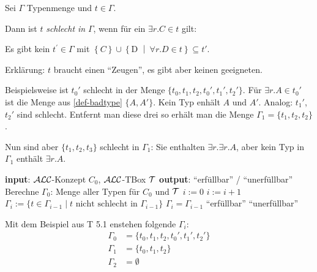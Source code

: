 \begin{definition}\label{def-badtype}

Sei $\Gamma$ Typenmenge und $t \in \Gamma$.

Dann ist $t$ \emph{schlecht in} $\Gamma$, wenn für ein $\exists r.C \in t$ gilt:

\begin{center}Es gibt kein $t^{'} \in \Gamma$ mit
$\left\{ C \right\} \cup \left\{ \text{D\ } \middle| \ \forall r.D \in t \right\} \subseteq t'$.\end{center}
\end{definition}

Erklärung: $t$ braucht einen \enquote{Zeugen}, es gibt aber keinen
geeigneten.

\begin{tafel}[continues=t:synTyp]

    Beispielsweise ist $t_0'$ schlecht in der Menge $\{t_0,t_1,t_2,t_0',t_1',t_2'\}$. Für $\exists r.A \in t_0'$ ist die Menge aus \autoref{def-badtype} $\{A,A'\}$. Kein Typ enhält $A$ und $A'$. Analog: $t_1'$, $t_2'$ sind schlecht. Entfernt man diese drei so erhält man die Menge $\Gamma_1 = \{t_1,t_2,t_2\}$. 

Nun sind aber $\{t_1,t_2,t_3\}$ schlecht in $\Gamma_1$: Sie enthalten $\exists r. \exists r.A$, aber kein Typ in $\Gamma_1$ enthält $\exists r.A$.
\end{tafel}

\begin{algorithmic}
    \State \textbf{input}: $\mathcal{A}\mathcal{L}\mathcal{C}$-Konzept $C_0$, $\mathcal{A}\mathcal{L}\mathcal{C}$-TBox $\mathcal{T}$
    \State \textbf{output}: \enquote{erfüllbar} / \enquote{unerfüllbar}
    \State Berechne $\Gamma_0$: Menge aller Typen für $C_0$ und $\mathcal{T}$
    \State $i := 0$
    \Repeat
        \State $i := i + 1$
        \State $\Gamma_i := \{ t \in \Gamma_{i - 1} \mid t \text{ nicht schlecht in } \Gamma_{i - 1}\}$
    \Until $\Gamma_i = \Gamma_{i - 1}$
        \Return \enquote{erfüllbar}
    \Else{}
        \Return \enquote{unerfüllbar}
    \EndIf
    \EndProcedure{}
\end{algorithmic}

\begin{tafel}[continues=t:synTyp]
    Mit dem Beispiel aus T 5.1 enstehen folgende $\Gamma_i$:
    \begin{align*}
        \Gamma_0 &= \{t_0, t_1, t_2, t_0', t_1', t_2'\}\\
        \Gamma_1 &= \{t_0, t_1, t_2\}\\
        \Gamma_2 &= \emptyset
    \end{align*}
\end{tafel}

